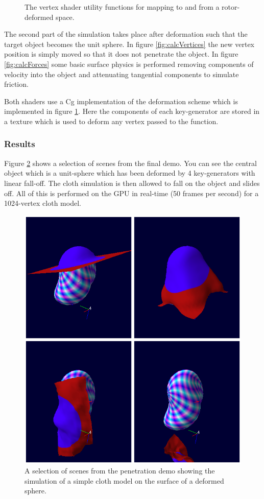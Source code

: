\begin{figure}[p]
\centering
\scalebox{0.7}{
\begin{minipage}{\textwidth}
\singlespacing

\end{minipage}}
\caption{\label{fig:map}The vertex shader utility functions for mapping to and
  from a rotor-deformed space.}
\end{figure}

The second part of the simulation takes place after deformation such that the
target object becomes the unit sphere. In figure \ref{fig:calcVertices} the new
vertex position is simply moved so that it does not penetrate the object. In
figure \ref{fig:calcForces} some basic surface physics is performed removing
components of velocity into the object and attenuating tangential components to
simulate friction. 

Both shaders use a Cg implementation of the deformation scheme which is
implemented in figure \ref{fig:map}. Here the components of each key-generator
are stored in a texture which is used to deform any vertex passed to the
function.

\subsubsection{Results}

Figure \ref{fig:cloth_montage} shows a selection of scenes from the final demo.
You can see the central object which is a unit-sphere which has been deformed
by 4 key-generators with linear fall-off. The cloth simulation is then allowed
to fall on the object and slides off. All of this is performed on the GPU in
real-time (50 frames per second) for a 1024-vertex cloth model.

\begin{figure}[p]
\centering
\includegraphics[width=\textwidth]{cloth_montage}
\caption{\label{fig:cloth_montage}%
  A selection of scenes from the penetration demo showing the
  simulation of a simple cloth model on the surface of a deformed
  sphere.
}
\end{figure}

